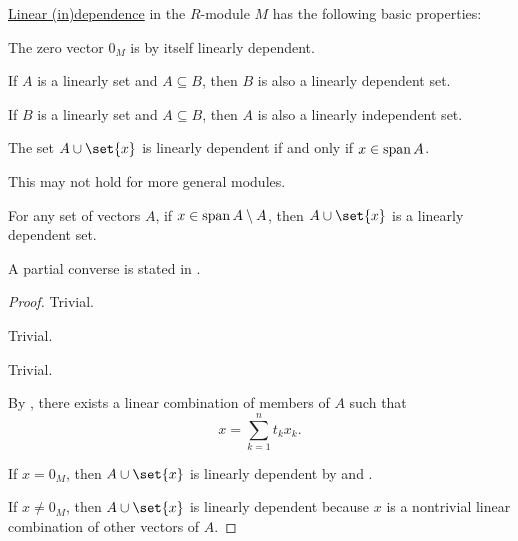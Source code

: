 \begin{proposition}\label{thm:def:linear_dependence}
  \hyperref[def:linear_dependence]{Linear (in)dependence} in the \( R \)-module \( M \) has the following basic properties:
  \begin{thmenum}
     The zero vector \( 0_M \) is by itself linearly dependent.

     If \( A \) is a linearly  set and \( A \subseteq B \), then \( B \) is also a linearly dependent set.

     If \( B \) is a linearly  set and \( A \subseteq B \), then \( A \) is also a linearly independent set.

     The set \( A \cup \set{ x } \) is linearly dependent if and only if \( x \in \operatorname{span} A \).

    This may not hold for more general modules.

     For any set of vectors \( A \), if \( x \in \operatorname{span} A \setminus A \), then \( A \cup \set{ x } \) is a linearly dependent set.

    A partial converse is stated in .
  \end{thmenum}
\end{proposition}
\begin{proof}
   Trivial.

   Trivial.

   Trivial.

   By , there exists a linear combination of members of \( A \) such that
  \begin{equation*}
    x = \sum_{k=1}^n t_k x_k.
  \end{equation*}

  If \( x = 0_M \), then \( A \cup \set{ x } \) is linearly dependent by  and .

  If \( x \neq 0_M \), then \( A \cup \set{ x } \) is linearly dependent because \( x \) is a nontrivial linear combination of other vectors of \( A \).
\end{proof}

